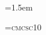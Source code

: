 \emergencystretch=1.5em

\font\scshape=cmcsc10

\def\emph#1{{\it #1}}

\def\leadin#1{{\leadinstyle#1}}
\def\leadinstyle{\noindent\scshape}
